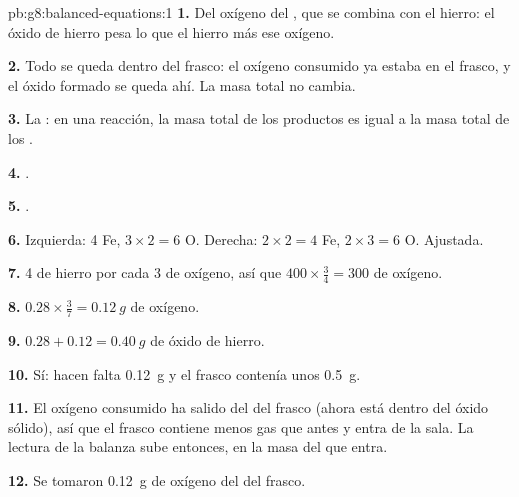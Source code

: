 \begin{solution}{pb:g8:balanced-equations:1}
\textbf{1.} Del oxígeno del , que se combina con el hierro: el
óxido de hierro pesa lo que el hierro más ese oxígeno.

\textbf{2.} Todo se queda dentro del frasco: el oxígeno consumido ya
estaba en el frasco, y el óxido formado se queda ahí. La masa total no
cambia.

\textbf{3.} La : en una reacción, la masa total
de los productos es igual a la masa total de los .

\textbf{4.} .

\textbf{5.} .

\textbf{6.} Izquierda: 4 Fe, $3 \times 2 = 6$ O. Derecha: $2 \times 2 = 4$
Fe, $2 \times 3 = 6$ O. Ajustada.

\textbf{7.} 4  de hierro por cada 3  de oxígeno, así que
$400 \times
\frac{3}{4} = 300$  de oxígeno.

\textbf{8.} $0.28 \times \frac{3}{7} = \qty{0.12}{g}$ de oxígeno.

\textbf{9.} $0.28 + 0.12 = \qty{0.40}{g}$ de óxido de hierro.

\textbf{10.} Sí: hacen falta \qty{0.12}{g} y el frasco contenía unos
\qty{0.5}{g}.

\textbf{11.} El oxígeno consumido ha salido del  del frasco (ahora
está dentro del óxido sólido), así que el frasco contiene menos gas que
antes y entra  de la sala. La lectura de la balanza sube entonces,
en la masa del  que entra.

\textbf{12.} Se tomaron \qty{0.12}{g} de oxígeno del  del frasco.
\end{solution}
